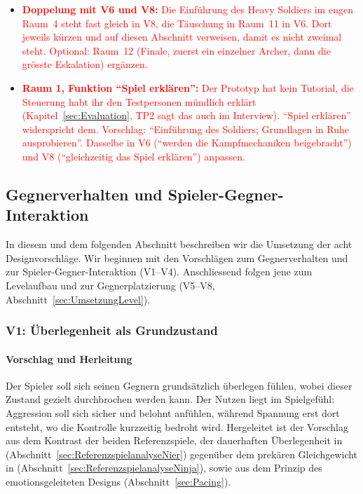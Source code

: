 \documentclass[../Main.tex]{subfiles}
\begin{document}
\begin{itemize}[leftmargin=1.5cm]
    \item \textcolor{red}{\textbf{Doppelung mit V6 und V8:} Die Einführung des Heavy Soldiers im engen Raum~4 steht fast gleich in V8, die Täuschung in Raum~11 in V6. Dort jeweils kürzen und auf diesen Abschnitt verweisen, damit es nicht zweimal steht. Optional: Raum~12 (Finale, zuerst ein einzelner Archer, dann die grösste Eskalation) ergänzen.}
    \item \textcolor{red}{\textbf{Raum 1, Funktion \enquote{Spiel erklären}:} Der Prototyp hat kein Tutorial, die Steuerung habt ihr den Testpersonen mündlich erklärt (Kapitel~\ref{sec:Evaluation}, TP2 sagt das auch im Interview). \enquote{Spiel erklären} widerspricht dem. Vorschlag: \enquote{Einführung des Soldiers; Grundlagen in Ruhe ausprobieren}. Dasselbe in V6 (\enquote{werden die Kampfmechaniken beigebracht}) und V8 (\enquote{gleichzeitig das Spiel erklären}) anpassen.}
\end{itemize}

\subsection{Gegnerverhalten und Spieler-Gegner-Interaktion} \label{sec:UmsetzungGegner}

In diesem und dem folgenden Abschnitt beschreiben wir die Umsetzung der acht Designvorschläge. Wir beginnen mit den Vorschlägen zum Gegnerverhalten und zur Spieler-Gegner-Interaktion (V1--V4). Anschliessend folgen jene zum Levelaufbau und zur Gegnerplatzierung (V5--V8, Abschnitt~\ref{sec:UmsetzungLevel}).

\subsubsection{V1: Überlegenheit als Grundzustand} \label{sec:V1}

\paragraph{Vorschlag und Herleitung}
Der Spieler soll sich seinen Gegnern grundsätzlich überlegen fühlen, wobei dieser Zustand gezielt durchbrochen werden kann. Der Nutzen liegt im Spielgefühl: Aggression soll sich sicher und belohnt anfühlen, während Spannung erst dort entsteht, wo die Kontrolle kurzzeitig bedroht wird. Hergeleitet ist der Vorschlag aus dem Kontrast der beiden Referenzspiele, der dauerhaften Überlegenheit in  (Abschnitt~\ref{sec:ReferenzspielanalyseNier}) gegenüber dem prekären Gleichgewicht in  (Abschnitt~\ref{sec:ReferenzspielanalyseNinja}), sowie aus dem Prinzip des emotionsgeleiteten Designs (Abschnitt~\ref{sec:Pacing}).
\end{document}
